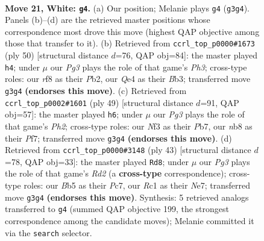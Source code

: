\documentclass[11pt]{article}
\begin{document}
\clearpage

\begin{figure}[p]\centering
\begin{subfigure}{0.46\textwidth}\centering
\resizebox{\linewidth}{!}{%
\newchessgame
\chessboard[
  setfen={1nb2r1k/2q2p2/1p2p1p1/1B5p/3PQ3/5NP1/r1P2PP1/2RN1K2 w - - 0 21},
  showmover=false,
  pgfstyle=straightmove, color=movearrow, markmove={g3-g4}
]}
\caption{}
\end{subfigure}\hfill
\begin{subfigure}{0.46\textwidth}\centering
\resizebox{\linewidth}{!}{%
\newchessgame
\chessboard[
  setfen={r4b1k/2pq1pp1/2n3bp/1p6/3P4/1B2QNNP/1P3PP1/3R2K1 w - - 1 26},
  showmover=false,
  pgfstyle=straightmove, color=movearrow, markmove={h3-h4}
]}
\caption{}
\end{subfigure}
\\[4pt]
\begin{subfigure}{0.46\textwidth}\centering
\resizebox{\linewidth}{!}{%
\newchessgame
\chessboard[
  setfen={r5k1/pp3ppp/2b2n2/2B5/8/P4PqP/1PQ3P1/1K1R1B2 b - - 2 25},
  showmover=false,
  pgfstyle=straightmove, color=movearrow, markmove={h7-h6}
]}
\caption{}
\end{subfigure}\hfill
\begin{subfigure}{0.46\textwidth}\centering
\resizebox{\linewidth}{!}{%
\newchessgame
\chessboard[
  setfen={6k1/1pprnpbp/p5p1/q7/4PBQ1/P1N4P/1P3PP1/2R3K1 b - - 3 22},
  showmover=false,
  pgfstyle=straightmove, color=movearrow, markmove={d7-d8}
]}
\caption{}
\end{subfigure}
\caption{\textbf{Move 21, White: \texttt{g4}.} (a) Our position; Melanie plays \texttt{g4} (\texttt{g3g4}). Panels (b)--(d) are the retrieved master positions whose correspondence most drove this move (highest QAP objective among those that transfer to it). (b) Retrieved from \texttt{ccrl\_top\_p0000\#1673} (ply 50) [structural distance $d$=76, QAP obj=84]: the master played \texttt{h4}; under $\mu$ our \emph{Pg3} plays the role of that game's \emph{Ph3}; cross-type roles: our \emph{r}f8 as their \emph{P}b2, our \emph{Q}e4 as their \emph{B}b3; transferred move \texttt{g3g4} \textbf{(endorses this move)}. (c) Retrieved from \texttt{ccrl\_top\_p0002\#1601} (ply 49) [structural distance $d$=91, QAP obj=57]: the master played \texttt{h6}; under $\mu$ our \emph{Pg3} plays the role of that game's \emph{Ph2}; cross-type roles: our \emph{N}f3 as their \emph{P}b7, our \emph{n}b8 as their \emph{P}f7; transferred move \texttt{g3g4} \textbf{(endorses this move)}. (d) Retrieved from \texttt{ccrl\_top\_p0000\#3148} (ply 43) [structural distance $d$=78, QAP obj=33]: the master played \texttt{Rd8}; under $\mu$ our \emph{Pg3} plays the role of that game's \emph{Rd2} (a \textbf{cross-type} correspondence); cross-type roles: our \emph{B}b5 as their \emph{P}c7, our \emph{R}c1 as their \emph{N}e7; transferred move \texttt{g3g4} \textbf{(endorses this move)}. Synthesis: 5 retrieved analogs transferred to \texttt{g4} (summed QAP objective 199, the strongest correspondence among the candidate moves); Melanie committed it via the \texttt{search} selector.}
\label{fig:thought-m40}
\end{figure}
\end{document}
